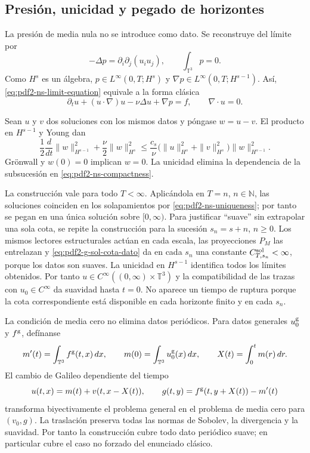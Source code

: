 \subsection{Presión, unicidad y pegado de horizontes}

La presión de media nula no se introduce como dato. Se reconstruye del límite por
\begin{equation}\label{eq:pdf2-ns-pressure}
 -\Delta p=\partial_i\partial_j(u_i u_j),
 \qquad \int_{\mathbb T^3}p=0.
\end{equation}
Como $H^s$ es un álgebra, $p\in L^\infty(0,T;H^s)$ y
$\nabla p\in L^\infty(0,T;H^{s-1})$. Así,
\eqref{eq:pdf2-ns-limit-equation} equivale a la forma clásica
\[
 \partial_tu+(u\cdot\nabla)u-\nu\Delta u+\nabla p=f,
 \qquad\nabla\!\cdot u=0.
\]

Sean $u$ y $v$ dos soluciones con los mismos datos y póngase $w=u-v$. El producto
en $H^{s-1}$ y Young dan
\begin{equation}\label{eq:pdf2-ns-uniqueness}
 \frac12\frac{d}{dt}\|w\|_{H^{s-1}}^2
 +\frac\nu2\|w\|_{H^s}^2
 \le \frac{c_s}{\nu}
 \bigl(\|u\|_{H^s}^2+\|v\|_{H^s}^2\bigr)
 \|w\|_{H^{s-1}}^2.
\end{equation}
Grönwall y $w(0)=0$ implican $w=0$. La unicidad elimina la dependencia de la
subsucesión en \eqref{eq:pdf2-ns-compactness}.

La construcción vale para todo $T<\infty$. Aplicándola en $T=n$, $n\in\mathbb N$,
las soluciones coinciden en los solapamientos por
\eqref{eq:pdf2-ns-uniqueness}; por tanto se pegan en una única solución sobre
$[0,\infty)$. Para justificar ``suave'' sin extrapolar una sola cota, se repite
la construcción para la sucesión $s_n=s+n$, $n\ge0$. Los mismos lectores
estructurales actúan en cada escala, las proyecciones $P_M$ las entrelazan y
\eqref{eq:pdf2-g-sol-cota-dato} da en cada $s_n$ una constante
$C_{T,s_n}^{\rm sol}<\infty$, porque los datos son suaves. La unicidad en
$H^{s-1}$ identifica todos los límites obtenidos. Por
tanto $u\in C^\infty((0,\infty)\times\mathbb T^3)$ y la compatibilidad de las
trazas con $u_0\in C^\infty$ da suavidad hasta $t=0$. No aparece un tiempo de
ruptura porque la cota correspondiente está disponible en cada horizonte
finito y en cada $s_n$.

La condición de media cero no elimina datos periódicos. Para datos generales
$u_0^{\rm g}$ y $f^{\rm g}$, defínanse
\[
 m'(t)=\int_{\mathbb T^3}f^{\rm g}(t,x)\,dx,\qquad
 m(0)=\int_{\mathbb T^3}u_0^{\rm g}(x)\,dx,\qquad
 X(t)=\int_0^tm(r)\,dr.
\]
El cambio de Galileo dependiente del tiempo
\begin{equation}\label{eq:pdf2-ns-mean-reduction}
 u(t,x)=m(t)+v(t,x-X(t)),\qquad
 g(t,y)=f^{\rm g}(t,y+X(t))-m'(t)
\end{equation}
transforma biyectivamente el problema general en el problema de media cero
para $(v_0,g)$. La traslación preserva todas las normas de Sobolev, la
divergencia y la suavidad. Por tanto la construcción cubre todo dato periódico
suave; en particular cubre el caso no forzado del enunciado clásico.

